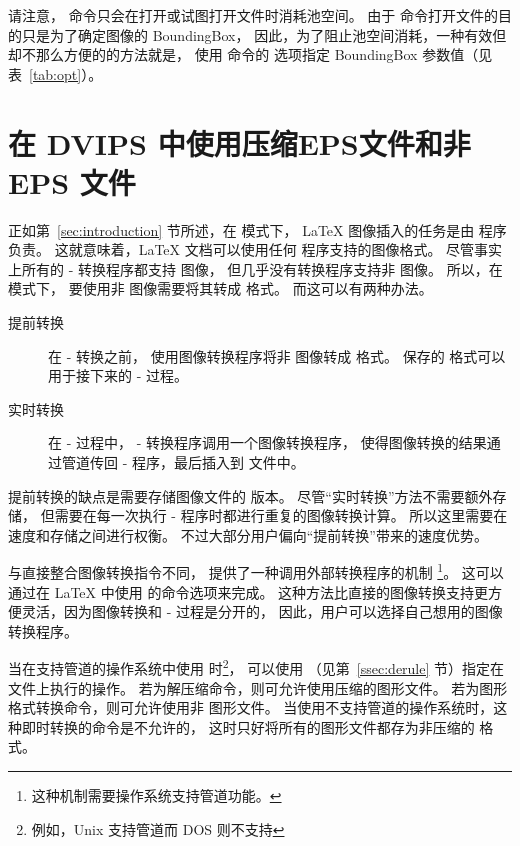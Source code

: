 请注意， 命令只会在打开或试图打开文件时消耗池空间。
由于  命令打开文件的目的只是为了确定图像的 BoundingBox，
因此，为了阻止池空间消耗，一种有效但却不那么方便的的方法就是，
使用  命令的  选项指定 BoundingBox 参数值（见表~\ref{tab:opt}）。


\section{在 DVIPS 中使用压缩EPS文件和非 EPS 文件}\label{sec:dvips-noneps}

正如第~\ref{sec:introduction} 节所述，在  模式下，
\LaTeX{} 图像插入的任务是由  程序负责。
这就意味着，\LaTeX{} 文档可以使用任何  程序支持的图像格式。
尽管事实上所有的 - 转换程序都支持  图像，
但几乎没有转换程序支持非  图像。
所以，在  模式下，
要使用非  图像需要将其转成  格式。
而这可以有两种办法。
\begin{description}
	\item[提前转换] 在 - 转换之前，
	使用图像转换程序将非 图像转成 格式。
	保存的  格式可以用于接下来的 - 过程。
	
	\item[实时转换] 在 - 过程中，
	- 转换程序调用一个图像转换程序，
	使得图像转换的结果通过管道传回 - 程序，最后插入到  文件中。
\end{description}
提前转换的缺点是需要存储图像文件的  版本。
尽管“实时转换”方法不需要额外存储，
但需要在每一次执行 - 程序时都进行重复的图像转换计算。
所以这里需要在速度和存储之间进行权衡。
不过大部分用户偏向“提前转换”带来的速度优势。

与直接整合图像转换指令不同， 提供了一种调用外部转换程序的机制
\footnote{
	这种机制需要操作系统支持管道功能。}。
这可以通过在 \LaTeX{} 中使用  的命令选项来完成。
这种方法比直接的图像转换支持更方便灵活，因为图像转换和 - 过程是分开的，
因此，用户可以选择自己想用的图像转换程序。

当在支持管道的操作系统中使用  时\footnote{
	例如，Unix 支持管道而 DOS 则不支持}，
可以使用  （见第~\ref{ssec:derule} 节）指定在文件上执行的操作。
若为解压缩命令，则可允许使用压缩的图形文件。
若为图形格式转换命令，则可允许使用非  图形文件。
当使用不支持管道的操作系统时，这种即时转换的命令是不允许的，
这时只好将所有的图形文件都存为非压缩的  格式。

